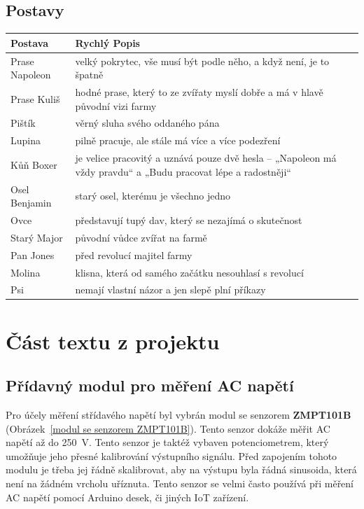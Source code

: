 \documentclass{article}
\newcommand{\sectionbreak}{\clearpage}
\begin{document}
\subsection{Postavy}
\begin{tabular}{|l|p{10cm}|}
  \hline
  {\bf Postava} & {\bf Rychlý Popis} \\
  \hline \hline
  Prase Napoleon    & velký pokrytec, vše musí být podle něho, a když není, je to špatně \\
  Prase Kuliš       & hodné prase, který to ze zvířaty myslí dobře a má v hlavě původní vizi farmy\\
  Pištík            & věrný sluha svého oddaného pána \\
  Lupina            & pilně pracuje, ale stále má více a více podezření\\
  Kůň Boxer         & je velice pracovitý a uznává pouze dvě hesla – „Napoleon má vždy pravdu“ a „Budu pracovat lépe a radostněji“\\
  Osel Benjamin     & starý osel, kterému je všechno jedno\\
  Ovce              & představují tupý dav, který se nezajímá o skutečnost\\
  Starý Major       & původní vůdce zvířat na farmě\\
  Pan Jones         & před revolucí majitel farmy\\
  Molina            & klisna, která od samého začátku nesouhlasí s revolucí\\
  Psi               & nemají vlastní názor a jen slepě plní příkazy \\
  
  \hline
\end{tabular}

\sectionbreak

\section{Část textu z projektu}
\subsection{Přídavný modul pro měření AC napětí}

Pro účely měření střídavého napětí byl vybrán modul se senzorem 
\textbf{ZMPT101B} (Obrázek~\ref{modul se senzorem ZMPT101B}). Tento senzor dokáže měřit AC napětí až do 250~V. 
Tento senzor je taktéž vybaven potenciometrem, který umožňuje jeho přesné kalibrování výstupního signálu. Před 
zapojením tohoto modulu je třeba jej řádně skalibrovat, aby na výstupu byla řádná sinusoida, která není na 
žádném vrcholu uříznuta. Tento senzor se velmi často používá při měření AC napětí pomocí Arduino desek, či 
jiných IoT zařízení.
\end{document}
